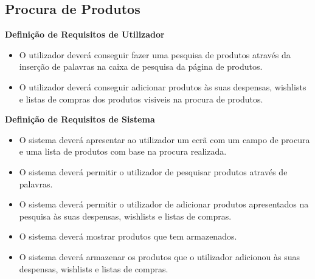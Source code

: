 \documentclass[a4paper]{report}
\begin{document}
        \subsection{Procura de Produtos}
            \textbf{Definição de Requisitos de Utilizador}
            \begin{itemize}
                \item O utilizador deverá conseguir fazer uma pesquisa
                de produtos através da inserção de palavras na caixa
                de pesquisa da página de produtos.
                \item O utilizador deverá conseguir adicionar produtos
                às suas despensas, wishlists e listas de compras dos produtos 
                visiveis na procura de produtos.
            \end{itemize}
            \textbf{Definição de Requisitos de Sistema}
            \begin{itemize}
                \item O sistema deverá apresentar ao utilizador um ecrã
                com um campo de procura e uma lista de produtos com base
                na procura realizada.
                \item O sistema deverá permitir o utilizador de pesquisar
                produtos através de palavras.
                \item O sistema deverá permitir o utilizador de adicionar
                produtos apresentados na pesquisa às suas despensas,
                wishlists e listas de compras.
                \item O sistema deverá mostrar produtos que tem armazenados.
                \item O sistema deverá armazenar os produtos que o utilizador
                adicionou às suas despensas, wishlists e listas de compras.
            \end{itemize}
\end{document}
